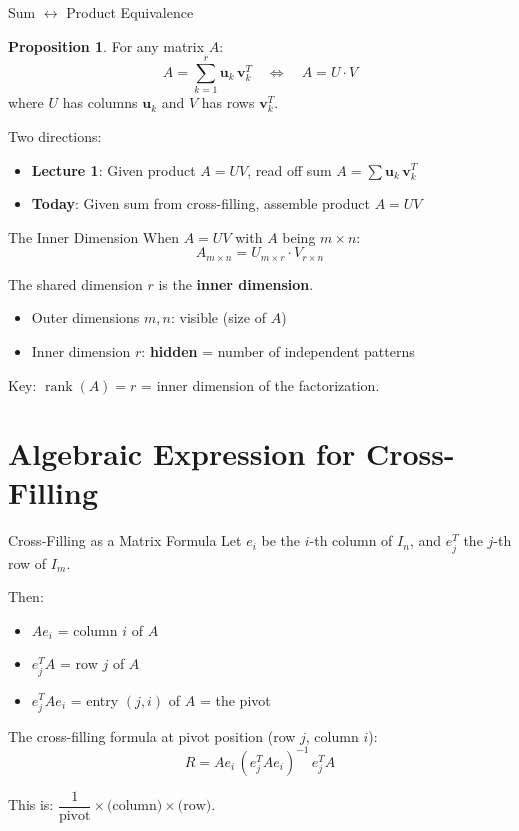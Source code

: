 \documentclass[10pt]{beamer}
\theoremstyle{definition}
\newtheorem{prop}{Proposition}[section]
\newcommand{\x}[1]{\alert{\textbf{#1}}}
\begin{document}
\begin{frame}{Sum $\leftrightarrow$ Product Equivalence}
\begin{prop}
For any matrix $A$:
$$A = \sum_{k=1}^r \mathbf{u}_k\,\mathbf{v}_k^T \quad \Longleftrightarrow \quad A = U \cdot V$$
where $U$ has columns $\mathbf{u}_k$ and $V$ has rows $\mathbf{v}_k^T$.
\end{prop}

\vfill
Two directions:
\begin{itemize}
\item \textbf{Lecture 1}: Given product $A = UV$, read off sum $A = \sum \mathbf{u}_k\,\mathbf{v}_k^T$
\item \textbf{Today}: Given sum from cross-filling, assemble product $A = UV$
\end{itemize}
\end{frame}

\begin{frame}{The Inner Dimension}
When $A = UV$ with $A$ being $m \times n$:
$$A_{m \times n} = U_{m \times \boxed{r}} \cdot V_{\boxed{r} \times n}$$

The shared dimension $r$ is the \x{inner dimension}.

\vfill
\begin{itemize}
\item Outer dimensions $m, n$: visible (size of $A$)
\item Inner dimension $r$: \x{hidden} = number of independent patterns
\end{itemize}

\vfill
Key: $\operatorname{rank}(A) = r$ = inner dimension of the factorization.
\end{frame}

\section{Algebraic Expression for Cross-Filling}

\begin{frame}{Cross-Filling as a Matrix Formula}
Let $e_i$ be the $i$-th column of $I_n$, and $e_j^T$ the $j$-th row of $I_m$.

\vfill
Then:
\begin{itemize}
\item $Ae_i$ = column $i$ of $A$
\item $e_j^T A$ = row $j$ of $A$
\item $e_j^T A e_i$ = entry $(j,i)$ of $A$ = the pivot
\end{itemize}

\vfill
The cross-filling formula at pivot position (row $j$, column $i$):
$$\boxed{R = A e_i \, (e_j^T A e_i)^{-1} \, e_j^T A}$$

\vfill
This is: $\dfrac{1}{\text{pivot}} \times \text{(column)} \times \text{(row)}$.
\end{frame}
\end{document}
